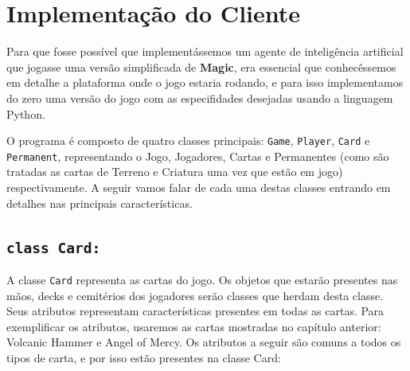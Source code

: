 \chapter{Implementação do Cliente}
\label{chap:impl}
Para que fosse possível que implementássemos um agente de inteligência artificial que
jogasse uma versão simplificada de \textbf{Magic}, era essencial que conhecêssemos em detalhe a
plataforma onde o jogo estaria rodando, e para isso implementamos do zero uma versão do
jogo com as especifidades desejadas usando a linguagem Python.

O programa é composto de quatro classes principais: \texttt{Game}, \texttt{Player}, \texttt{Card}
e \texttt{Permanent}, representando o Jogo, Jogadores, Cartas e Permanentes (como são tratadas as
cartas de Terreno e Criatura uma vez que estão em jogo) respectivamente. A seguir vamos falar de
cada uma destas classes entrando em detalhes nas principais características.

\section{\texttt{class Card:}}
A classe \texttt{Card} representa as cartas do jogo. Os objetos que estarão presentes nas mãos,
decks e cemitérios dos jogadores serão classes que herdam desta classe. Seus atributos representam
características presentes em todas as cartas. Para exemplificar os atributos, usaremos as cartas mostradas no capítulo anterior: Volcanic Hammer e Angel of Mercy. Os atributos a seguir são comuns a todos os tipos de carta, e por isso estão presentes na
classe Card:

